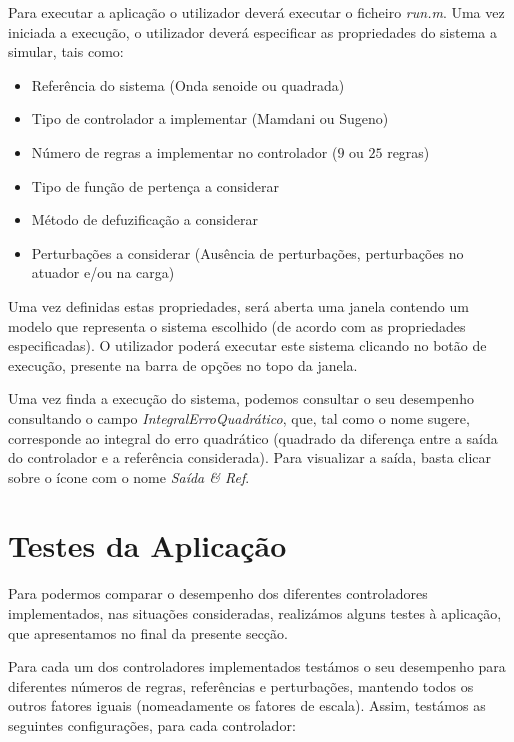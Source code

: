 \documentclass{article}
\begin{document}
Para executar a aplicação o utilizador deverá executar o ficheiro \emph{run.m}. Uma vez iniciada a execução, o utilizador deverá especificar as propriedades do sistema a simular, tais como:

\begin{itemize}
\item Referência do sistema (Onda senoide ou quadrada)
\item Tipo de controlador a implementar (Mamdani ou Sugeno)
\item Número de regras a implementar no controlador ($9$ ou $25$ regras)
\item Tipo de função de pertença a considerar
\item Método de defuzificação a considerar
\item Perturbações a considerar (Ausência de perturbações, perturbações no atuador e/ou na carga)
\end{itemize}

Uma vez definidas estas propriedades, será aberta uma janela contendo um modelo que representa o sistema escolhido (de acordo com as propriedades especificadas). O utilizador poderá executar este sistema clicando no botão de execução, presente na barra de opções no topo da janela.

Uma vez finda a execução do sistema, podemos consultar o seu desempenho consultando o campo \emph{IntegralErroQuadrático}, que, tal como o nome sugere, corresponde ao integral do erro quadrático (quadrado da diferença entre a saída do controlador e a referência considerada). Para visualizar a saída, basta clicar sobre o ícone com o nome \emph{Saída \& Ref}.

\pagebreak

\section{Testes da Aplicação}

Para podermos comparar o desempenho dos diferentes controladores implementados, nas situações consideradas, realizámos alguns testes à aplicação, que apresentamos no final da presente secção.

Para cada um dos controladores implementados testámos o seu desempenho para diferentes números de regras, referências e perturbações, mantendo todos os outros fatores iguais (nomeadamente os fatores de escala). Assim, testámos as seguintes configurações, para cada controlador:
\end{document}
